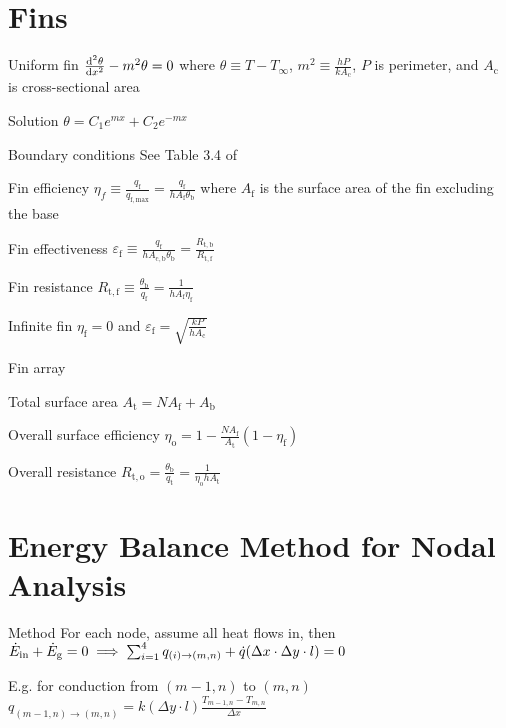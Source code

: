 \documentclass{article}
\begin{document}
\begin{multicols}{2}
\setlength{\columnseprule}{0.5pt}

\section{Fins}
\begin{description*}
\item[Uniform fin]
  \(\od[2]{\theta}{x} - m^2\theta = 0\) where
  \(\theta \equiv T-T_\infty\),
  \(m^2 \equiv \frac{hP}{kA_\mathrm{c}}\),
  $P$ is perimeter, and
  $A_\mathrm{c}$ is cross-sectional area
  \begin{description*}
  \item[Solution]
    \(\theta = C_1e^{mx} + C_2e^{-mx}\)
  \item[Boundary conditions] See Table 3.4 of \cite{hamt}
  \end{description*}
\item[Fin efficiency]
  \(\eta_f \equiv \frac{q_\mathrm{f}}{q_\mathrm{f,max}}
  = \frac{q_\mathrm{f}}{hA_\mathrm{f}\theta_\mathrm{b}}\)
  where $A_\mathrm{f}$ is the surface area of the fin excluding the base
\item[Fin effectiveness]
  \(\varepsilon_\mathrm{f} \equiv \frac{q_\mathrm{f}}{hA_\mathrm{c,b}\theta_\mathrm{b}}
  = \frac{R_\mathrm{t,b}}{R_\mathrm{t,f}}\)
\item[Fin resistance]
  \(R_\mathrm{t,f} \equiv \frac{\theta_\mathrm{b}}{q_\mathrm{f}}
  = \frac{1}{hA_\mathrm{f}\eta_\mathrm{f}}\)
\item[Infinite fin]
  \(\eta_\mathrm{f} = 0\) and
  \(\varepsilon_\mathrm{f} = \sqrt{\frac{kP}{hA_\mathrm{c}}}\)
\item[Fin array]~
  \begin{description*}
  \item[Total surface area]
    \(A_\mathrm{t} = NA_\mathrm{f} + A_\mathrm{b}\)
  \item[Overall surface efficiency]
    \(\eta_\mathrm{o} = 1 - \frac{NA_\mathrm{f}}{A_\mathrm{t}}(1-\eta_\mathrm{f})\)
  \item[Overall resistance]
    \(R_\mathrm{t,o} = \frac{\theta_\mathrm{b}}{q_\mathrm{t}}
    = \frac{1}{\eta_\mathrm{o}hA_\mathrm{t}}\)
  \end{description*}
\end{description*}

\section{Energy Balance Method for Nodal Analysis}
\begin{description*}
\item[Method] For each node, assume all heat flows in, then
  \(\dot{E}_\mathrm{in} + \dot{E}_\mathrm{g} = 0 \\
  \implies \sum_{i=1}^4q_{(i)\rightarrow(m,n)} + \dot{q}(\Delta{}x\cdot\Delta{}y\cdot{}l) = 0\)
\item[E.g. for conduction from $(m-1,n)$ to $(m,n)$]
  \(q_{(m-1,n)\rightarrow(m,n)} = k(\Delta{}y\cdot{}l)\frac{T_{m-1,n}-T_{m,n}}{\Delta{}x}\)
\end{description*}


\end{multicols}
\end{document}

